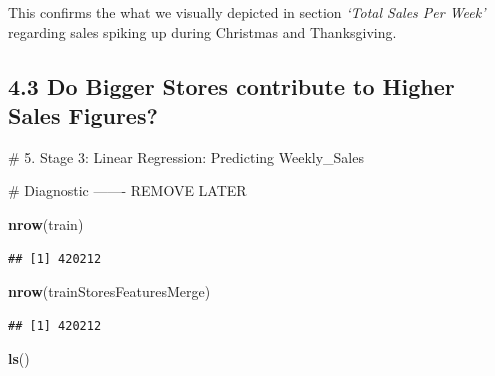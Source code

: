 \documentclass[]{article}
\newenvironment{Shaded}{\begin{snugshade}}{\end{snugshade}}
\newcommand{\KeywordTok}[1]{\textcolor[rgb]{0.13,0.29,0.53}{\textbf{{#1}}}}
\newcommand{\NormalTok}[1]{{#1}}
\begin{document}
This confirms the what we visually depicted in section \emph{`Total
Sales Per Week'} regarding sales spiking up during Christmas and
Thanksgiving.

\pagebreak

\subsection{4.3 Do Bigger Stores contribute to Higher Sales
Figures?}\label{do-bigger-stores-contribute-to-higher-sales-figures}

\pagebreak
\hfill \break
\hfill \break
\hfill \break
\hfill \break
\hfill \break
\hfill \break
\hfill \break
\hfill \break
\hfill \break
\hfill \break
\hfill \break
\hfill \break
\hfill \break
\hfill \break
\hfill \break
\hfill \break
\hfill \break
\hfill \break
\hfill \break
\hfill \break
\# 5. Stage 3: Linear Regression: Predicting Weekly\_Sales

\pagebreak
\# Diagnostic ------- REMOVE LATER

\begin{Shaded}
\begin{Highlighting}[]
\KeywordTok{nrow}\NormalTok{(train)}
\end{Highlighting}
\end{Shaded}

\begin{verbatim}
## [1] 420212
\end{verbatim}

\begin{Shaded}
\begin{Highlighting}[]
\KeywordTok{nrow}\NormalTok{(trainStoresFeaturesMerge)}
\end{Highlighting}
\end{Shaded}

\begin{verbatim}
## [1] 420212
\end{verbatim}

\begin{Shaded}
\begin{Highlighting}[]
\KeywordTok{ls}\NormalTok{()}
\end{Highlighting}
\end{Shaded}
\end{document}

